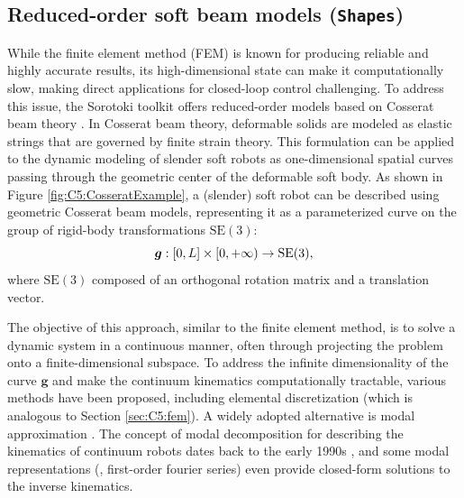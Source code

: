 \subsection{Reduced-order soft beam models (\texttt{Shapes})}
\label{sec:C5:shapes}
While the finite element method (FEM) is known for producing reliable and highly accurate results, its high-dimensional state can make it computationally slow, making direct applications for closed-loop control challenging. To address this issue, the Sorotoki toolkit offers reduced-order models based on Cosserat beam theory \cite{Boyer2010,Armanini2023,Simo1986}. In Cosserat beam theory, deformable solids are modeled as elastic strings that are governed by finite strain theory. This formulation can be applied to the dynamic modeling of slender soft robots as one-dimensional spatial curves passing through the geometric center of the deformable soft body. As shown in Figure \ref{fig:C5:CosseratExample}, a (slender) soft robot can be described using geometric Cosserat beam models, representing it as a parameterized curve on the group of rigid-body transformations $\textrm{SE}(3)$:
%
\begin{equation}
{\boldsymbol{g}}: [0,L] \times [0,+\infty) \to \textrm{SE}(3),
\end{equation}
%
where $\textrm{SE}(3)$ composed of an orthogonal rotation matrix and a translation vector. 

The objective of this approach, similar to the finite element method, is to solve a dynamic system in a continuous manner, often through projecting the problem onto a finite-dimensional subspace. To address the infinite dimensionality of the curve $\mathbf{g}$ and make the continuum kinematics computationally tractable, various methods have been proposed, including elemental discretization \cite{Gazzola2018,Till2019} (which is analogous to Section \ref{sec:C5:fem}). A widely adopted alternative is modal approximation \cite{Boyer2021,Chirikjian1994Jun}. The concept of modal decomposition for describing the kinematics of continuum robots dates back to the early 1990s \cite{Chirikjian1992Dec,Chirikjian1994Jun}, and some modal representations (\eg, first-order fourier series) even provide closed-form solutions to the inverse kinematics.

